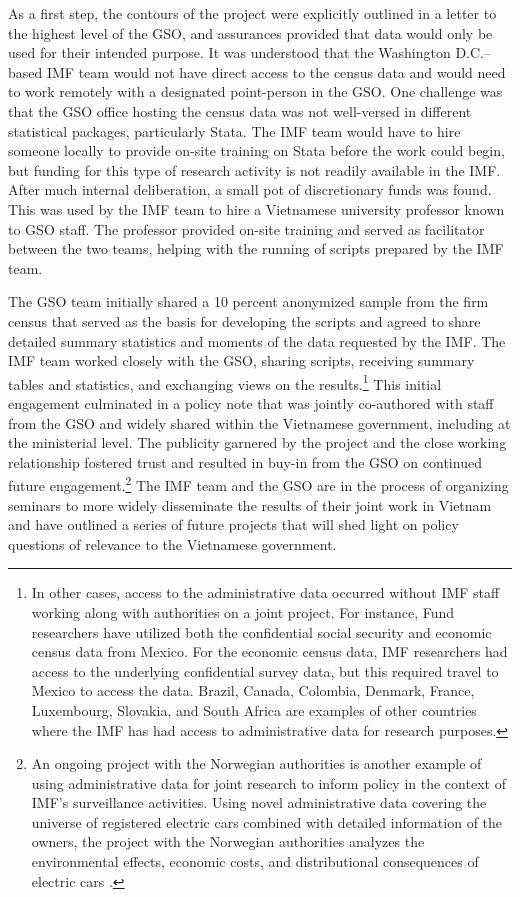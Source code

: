 \documentclass[
]{WileySix}
\begin{document}
As a first step, the contours of the project were explicitly outlined in a letter to the highest level of the GSO, and assurances provided that data would only be used for their intended purpose. It was understood that the Washington D.C.--based IMF team would not have direct access to the census data and would need to work remotely with a designated point-person in the GSO. One challenge was that the GSO office hosting the census data was not well-versed in different statistical packages, particularly Stata. The IMF team would have to hire someone locally to provide on-site training on Stata before the work could begin, but funding for this type of research activity is not readily available in the IMF. After much internal deliberation, a small pot of discretionary funds was found. This was used by the IMF team to hire a Vietnamese university professor known to GSO staff. The professor provided on-site training and served as facilitator between the two teams, helping with the running of scripts prepared by the IMF team.

The GSO team initially shared a 10 percent anonymized sample from the firm census that served as the basis for developing the scripts and agreed to share detailed summary statistics and moments of the data requested by the IMF. The IMF team worked closely with the GSO, sharing scripts, receiving summary tables and statistics, and exchanging views on the results.\footnote{In other cases, access to the administrative data occurred without IMF staff working along with authorities on a joint project. For instance, Fund researchers have utilized both the confidential social security and economic census data from Mexico. For the economic census data, IMF researchers had access to the underlying confidential survey data, but this required travel to Mexico to access the data. Brazil, Canada, Colombia, Denmark, France, Luxembourg, Slovakia, and South Africa are examples of other countries where the IMF has had access to administrative data for research purposes.} This initial engagement culminated in a policy note that was jointly co-authored with staff from the GSO and widely shared within the Vietnamese government, including at the ministerial level. The publicity garnered by the project and the close working relationship fostered trust and resulted in buy-in from the GSO on continued future engagement.\footnote{An ongoing project with the Norwegian authorities is another example of using administrative data for joint research to inform policy in the context of IMF's surveillance activities. Using novel administrative data covering the universe of registered electric cars combined with detailed information of the owners, the project with the Norwegian authorities analyzes the environmental effects, economic costs, and distributional consequences of electric cars \citep{holtsmark2020}.} The IMF team and the GSO are in the process of organizing seminars to more widely disseminate the results of their joint work in Vietnam and have outlined a series of future projects that will shed light on policy questions of relevance to the Vietnamese government.
\end{document}
